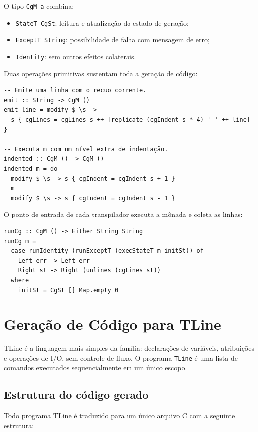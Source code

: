 O tipo \texttt{CgM a} combina:
\begin{itemize}
  \item \texttt{StateT CgSt}: leitura e atualização do estado de geração;
  \item \texttt{ExceptT String}: possibilidade de falha com mensagem de erro;
  \item \texttt{Identity}: sem outros efeitos colaterais.
\end{itemize}

Duas operações primitivas sustentam toda a geração de código:

\begin{verbatim}
-- Emite uma linha com o recuo corrente.
emit :: String -> CgM ()
emit line = modify $ \s ->
  s { cgLines = cgLines s ++ [replicate (cgIndent s * 4) ' ' ++ line] }

-- Executa m com um nível extra de indentação.
indented :: CgM () -> CgM ()
indented m = do
  modify $ \s -> s { cgIndent = cgIndent s + 1 }
  m
  modify $ \s -> s { cgIndent = cgIndent s - 1 }
\end{verbatim}

O ponto de entrada de cada transpilador executa a mônada e coleta as linhas:

\begin{verbatim}
runCg :: CgM () -> Either String String
runCg m =
  case runIdentity (runExceptT (execStateT m initSt)) of
    Left err -> Left err
    Right st -> Right (unlines (cgLines st))
  where
    initSt = CgSt [] Map.empty 0
\end{verbatim}

\section{Geração de Código para TLine}\label{sec:codegen-tline}

TLine é a linguagem mais simples da família: declarações de variáveis,
atribuições e operações de I/O, sem controle de fluxo.  O programa
\texttt{TLine} é uma lista de comandos executados sequencialmente em um único
escopo.

\subsection{Estrutura do código gerado}

Todo programa TLine é traduzido para um único arquivo C com a seguinte
estrutura:

